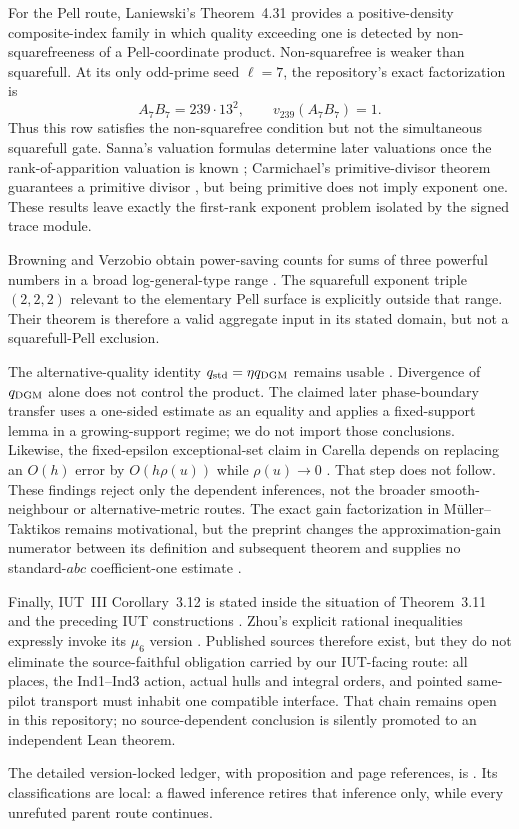 For the Pell route, Laniewski's Theorem~4.31 provides a positive-density
composite-index family in which quality exceeding one is detected by
non-squarefreeness of a Pell-coordinate product.  Non-squarefree is weaker
than squarefull.  At its only odd-prime seed $\ell=7$, the repository's exact
factorization is
\[
 A_7B_7=239\cdot13^2,\qquad v_{239}(A_7B_7)=1.
\]
Thus this row satisfies the non-squarefree condition but not the simultaneous
squarefull gate.  Sanna's valuation formulas determine later valuations once
the rank-of-apparition valuation is known \cite{Sanna2016}; Carmichael's
primitive-divisor theorem guarantees a primitive divisor
\cite{Yabuta2001}, but being primitive does not imply exponent one.  These
results leave exactly the first-rank exponent problem isolated by the signed
trace module.

Browning and Verzobio obtain power-saving counts for sums of three powerful
numbers in a broad log-general-type range
\cite[Theorem~1.2]{BrowningVerzobio2026}.  The squarefull exponent triple
$(2,2,2)$ relevant to the elementary Pell surface is explicitly outside that
range.  Their theorem is therefore a valid aggregate input in its stated
domain, but not a squarefull-Pell exclusion.

The alternative-quality identity
$q_{\rm std}=\eta q_{\rm DGM}$ remains usable
\cite{Sankaran2026AlternativeQuality}.  Divergence of $q_{\rm DGM}$ alone
does not control the product.  The claimed later phase-boundary transfer uses
a one-sided estimate as an equality and applies a fixed-support lemma in a
growing-support regime; we do not import those conclusions.  Likewise, the
fixed-epsilon exceptional-set claim in Carella depends on replacing an
$O(h)$ error by $O(h\rho(u))$ while $\rho(u)\to0$
\cite[Lemma~4.2]{Carella}.  That step does not follow.  These findings reject
only the dependent inferences, not the broader smooth-neighbour or
alternative-metric routes.  The exact gain factorization in
M\"uller--Taktikos remains motivational, but the preprint changes the
approximation-gain numerator between its definition and subsequent theorem
and supplies no standard-$abc$ coefficient-one estimate
\cite{MuellerTaktikos2026}.

Finally, IUT~III Corollary~3.12 is stated inside the situation of
Theorem~3.11 and the preceding IUT constructions \cite{IUT3}.  Zhou's explicit
rational inequalities expressly invoke its $\mu_6$ version
\cite{Zhou2025IUTRationals}.  Published sources therefore exist, but they do
not eliminate the source-faithful obligation carried by our IUT-facing route:
all places, the Ind1--Ind3 action, actual hulls and integral orders, and
pointed same-pilot transport must inhabit one compatible interface.  That
chain remains open in this repository; no source-dependent conclusion is
silently promoted to an independent Lean theorem.

The detailed version-locked ledger, with proposition and page references, is
.
Its classifications are local: a flawed inference retires that inference
only, while every unrefuted parent route continues.
